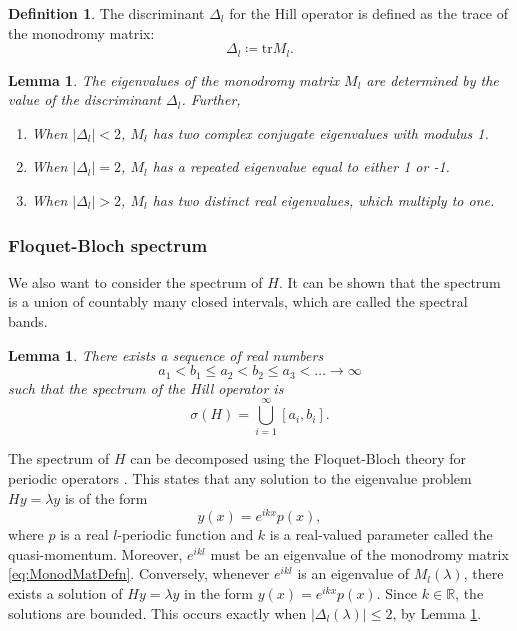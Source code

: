 \documentclass[a4paper]{article}
\newtheorem{lemma}[theorem]{Lemma}%
\theoremstyle{definition}
\newtheorem{definition}[theorem]{Definition}
\numberwithin{equation}{section}
\numberwithin{theorem}{section}
\newcommand{\tr}{\mathrm{tr}}
\begin{document}
{\begin{definition}
    The discriminant $\Delta_l$ for the Hill operator is defined as the trace of the monodromy matrix:
    \begin{equation*}
    \Delta_l \coloneqq \tr M_l.
\end{equation*}
\end{definition}

\begin{lemma} \label{lm:discriminant}
The eigenvalues of the monodromy matrix $M_l$ are determined by the value of the discriminant $\Delta_l$. Further,
    \begin{enumerate}
        \item When $|\Delta_l|<2$, $M_l$ has two complex conjugate eigenvalues with modulus 1.
        \item When $|\Delta_l|=2$, $M_l$ has a repeated eigenvalue equal to either 1 or -1.
        \item When $|\Delta_l|>2$, $M_l$ has two distinct real eigenvalues, which multiply to one.
    \end{enumerate}
\end{lemma}

\subsubsection{Floquet-Bloch spectrum}

We also want to consider the spectrum of $H$. It can be shown that the spectrum is a union of countably many closed intervals, which are called the spectral bands.
\begin{lemma}
    There exists a sequence of real numbers
    \begin{equation*}
        a_1<b_1\leq a_2<b_2\leq a_3<\dots\rightarrow\infty
    \end{equation*}
    such that the spectrum of the Hill operator is
    \begin{equation*}
        \sigma(H)=\bigcup_{i=1}^\infty[a_i,b_i].
    \end{equation*}
\end{lemma}

The spectrum of $H$ can be decomposed using the Floquet-Bloch theory for periodic operators \cite{kuchment2016overview}. This states that any solution to the eigenvalue problem $Hy = \lambda y$ is of the form 
\begin{equation*}
    y(x)=e^{ikx}p(x),
\end{equation*}
where $p$ is a real $l$-periodic function and $k$ is a real-valued parameter called the quasi-momentum. Moreover, $e^{ikl}$ must be an eigenvalue of the monodromy matrix \eqref{eq:MonodMatDefn}. Conversely, whenever $e^{ikl}$ is an eigenvalue of $M_l(\lambda)$, there exists a solution of $Hy=\lambda y$ in the form $y(x)=e^{ikx}p(x)$. Since $k\in\mathbb{R}$, the solutions are bounded. This occurs exactly when $|\Delta_l(\lambda)|\leq2$, by Lemma \ref{lm:discriminant}. 

}
\end{document}
